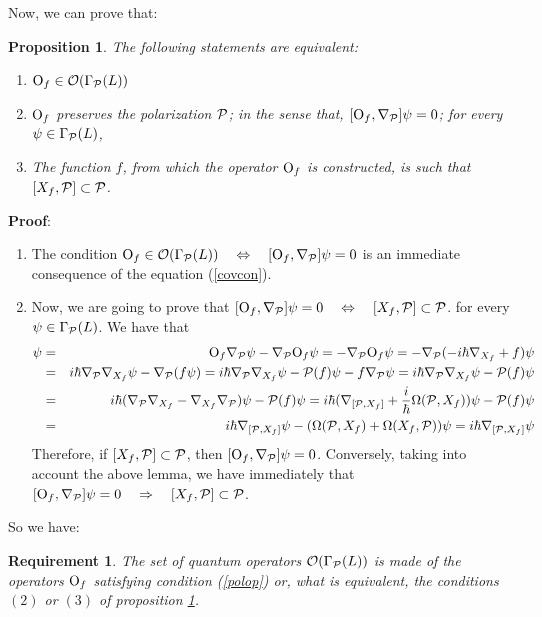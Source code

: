 \documentclass[12pt]{article}
\newtheorem{prop}{Proposition}
\newtheorem{require}{Requirement}
\def\beann{\begin{eqnarray*}}
\def\eeann{\end{eqnarray*}}
\def\qed{\ifvmode\removelastskip\fi
{\unskip\nobreak\hfil\penalty50\hbox{}\nobreak\hfil
\hbox{\vrule height1.2ex width1.2ex}\parfillskip=0pt
\finalhyphendemerits=0 \par\smallskip}}
\def\P{{\cal P}}
\def\Op{{\rm O}}
\begin{document}
Now, we can prove that:

\begin{prop}
The following statements are equivalent:
\begin{enumerate}
\item
$\Op_f \in {\cal O} (\Gamma_\P (L))$
\item
$\Op_f$ preserves the polarization $\P$; in the sense that,
$[\Op_f,\nabla_{\P}] \psi = 0$;
for every $\psi \in \Gamma_\P (L)$,
\item
The function $f$, from which the operator $\Op_f$ is constructed, is
such that
$[X_f,\P] \subset \P$.
\end{enumerate}
\label{cnspo}
\end{prop}
{\bf Proof}: 
\begin{enumerate}
\item
The condition
$\Op_f \in {\cal O} (\Gamma_\P (L)) \quad \Leftrightarrow \quad
[\Op_f,\nabla_{\P}] \psi = 0$
is an immediate consequence of the equation (\ref{covcon}).
\item
Now, we are going to prove that
$[\Op_f,\nabla_{\P}] \psi = 0
\quad \Leftrightarrow \quad
[X_f,\P] \subset \P$.
for every $\psi \in \Gamma_\P (L)$. We have that
\beann
[\Op_f,\nabla_{\P}] \psi
&=&
\Op_f\nabla_\P \psi - \nabla_\P \Op_f \psi =
-\nabla_\P \Op_f \psi =
-\nabla_\P (-i\hbar\nabla_{X_f}+f)\psi
\\ &=&
i\hbar\nabla_\P \nabla_{X_f}\psi - \nabla_\P (f\psi ) =
i\hbar\nabla_\P \nabla_{X_f}\psi - \P (f)\psi - f\nabla_\P \psi =
i\hbar\nabla_\P \nabla_{X_f}\psi - \P (f)\psi
\\ &=&
i\hbar(\nabla_\P \nabla_{X_f}-\nabla_{X_f}\nabla_{\P})\psi - \P (f)\psi
=
i\hbar(\nabla_{[\P ,X_f]}+\frac{i}{\hbar}\Omega (\P ,X_f))\psi - \P
(f)\psi
\\ &=&
i\hbar\nabla_{[\P ,X_f]}\psi - (\Omega (\P ,X_f) + \Omega (X_f,\P
))\psi  =
i\hbar\nabla_{[\P ,X_f]}\psi
\eeann
Therefore, if $[X_f,\P ] \subset \P$, then
$[\Op_f,\nabla_{\P}] \psi = 0$.
Conversely, taking into account the above lemma,
we have immediately that
$[\Op_f,\nabla_{\P}] \psi = 0
\quad \Rightarrow \quad
[X_f,\P] \subset \P$.
\end{enumerate}
\qed

So we have:

\begin{require}
The set of quantum operators
${\cal O} (\Gamma_\P (L))$
is made of the operators $\Op_f$ satisfying condition
(\ref{polop}) or, what is equivalent,
the conditions $(2)$ or $(3)$ of proposition \ref{cnspo}.
\label{quanop}
\end{require}
\end{document}
